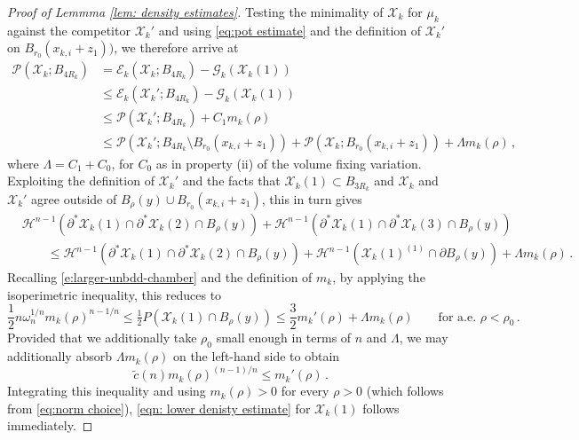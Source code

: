 \documentclass[10pt,reqno]{amsart}
\numberwithin{equation}{section}
\theoremstyle{definition}
\newcommand{\Ecal}{\mathcal{E}}
\newcommand{\Hcal}{\mathcal{H}}
\newcommand{\Pcal}{\mathcal{P}}
\newcommand{\cG}{\mathcal{G}}
\newcommand{\X}{\mathcal{X}}
\begin{document}
{\begin{proof}[Proof of Lemmma \ref{lem: density estimates}]
Testing the minimality of $\X_k$ for $\mu_k$ against the competitor $\X_k'$ and using \eqref{eq:pot estimate} and the definition of $\X_k'$ on $B_{r_0}(x_{k,i}+z_1))$, we therefore arrive at
\begin{align*}
    \Pcal(\X_k;B_{4R_k}) &= \Ecal_k(\X_k;B_{4R_k}) - \cG_k(\X_k(1)) \\
    &\leq \Ecal_k(\X_k';B_{4R_k}) - \cG_k(\X_k(1)) \\
    &\leq \Pcal(\X_k';B_{4R_k}) + C_1 m_k(\rho) \\ 
    &\leq \Pcal(\X_k';B_{4R_k}\setminus B_{r_0}(x_{k,i}+z_1)) + \Pcal(\X_k;B_{r_0}(x_{k,i}+z_1)) + \Lambda m_k(\rho)\,,
\end{align*}
where $\Lambda = C_1 + C_0$, for $C_0$ as in property (ii) of the volume fixing variation. Exploiting the definition of $\X_k'$ and the facts that $\X_k(1)\subset B_{3R_k}$ and $\X_k$ and $\X_k'$ agree outside of $B_{\rho}(y)\cup B_{r_0}(x_{k,i}+z_1)$,
this in turn gives
\begin{align*}
	&\mathcal{H}^{n-1}(\partial^*\X_k(1)\cap \partial^*\X_k(2)\cap B_\rho(y) ) + \mathcal{H}^{n-1}(\partial^*\X_k(1)\cap \partial^*\X_k(3)\cap B_\rho(y) ) \\
	&\qquad\leq \mathcal{H}^{n-1}(\partial^*\X_k(1)\cap \partial^*\X_k(2)\cap B_\rho(y) ) + \Hcal^{n-1}(\X_k(1)^{(1)}\cap \partial B_\rho(y) )  + \Lambda m_k(\rho)\,.
\end{align*}
Recalling \eqref{e:larger-unbdd-chamber} and the definition of $m_k$, by applying the isoperimetric inequality,
this reduces to
\[
	\frac{1}{2}{n\omega_n^{{1}/{n}}}m_k(\rho)^{{n-1}/{n}} \leq \tfrac{1}{2}P(\X_k(1)  \cap B_\rho(y)) \leq \frac{3}{2} m_k'(\rho)  + \Lambda m_k(\rho)\qquad \mbox{for a.e. $\rho<\rho_0$}\,.
\]
Provided that we additionally take $\rho_0 $ small enough in terms of $n$ and $\Lambda$, we may additionally absorb $\Lambda m_k(\rho)$ on the left-hand side to obtain
\[
    {\tilde c(n)}  m_k(\rho)^{(n-1)/n} \leq m_k'(\rho)\,.
\]
Integrating this inequality and using {$m_k(\rho)>0$} for every $\rho>0$ (which follows from \eqref{eq:norm choice}), \eqref{eqn: lower denisty estimate} for $\X_k(1)$ follows immediately.


\end{proof}}
\end{document}
